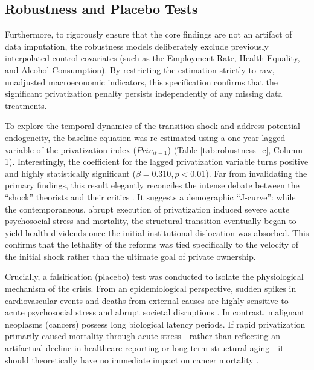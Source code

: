 \documentclass[12pt]{article}
\begin{document}
\subsection{Robustness and Placebo Tests}

Furthermore, to rigorously ensure that the core findings are not an artifact of data imputation, the robustness models deliberately exclude previously interpolated control covariates (such as the Employment 
Rate, Health Equality, and Alcohol Consumption). By restricting the estimation strictly to raw, unadjusted macroeconomic indicators, this specification confirms that the significant privatization penalty 
persists independently of any missing data treatments.

To explore the temporal dynamics of the transition shock and address potential endogeneity, the baseline equation was re-estimated using a one-year lagged variable of the privatization index ($Priv_{it-1}$) 
(Table \ref{tab:robustness_c}, Column 1). Interestingly, the coefficient for the lagged privatization variable turns positive and highly statistically significant ($\beta = 0.310, p < 0.01$). Far from 
invalidating the primary findings, this result elegantly reconciles the intense debate between the ``shock'' theorists \citep{Stuckler2009} and their critics \citep{Earle2013}. It suggests a demographic 
``J-curve'': while the contemporaneous, abrupt execution of privatization induced severe acute psychosocial stress and mortality, the structural transition eventually began to yield health dividends once 
the initial institutional dislocation was absorbed. This confirms that the lethality of the reforms was tied specifically to the velocity of the initial shock rather than the ultimate goal of private ownership.

Crucially, a falsification (placebo) test was conducted to isolate the physiological mechanism of the crisis. From an epidemiological perspective, sudden spikes in cardiovascular events and deaths from 
external causes are highly sensitive to acute psychosocial stress and abrupt societal disruptions \citep{Leon1998, Brainerd2005}. In contrast, malignant neoplasms (cancers) possess long biological latency 
periods. If rapid privatization primarily caused mortality through acute stress---rather than reflecting an artifactual decline in healthcare reporting or long-term structural aging---it should theoretically 
have no immediate impact on cancer mortality \citep{Leon1997, Brainerd2005}.
\end{document}
